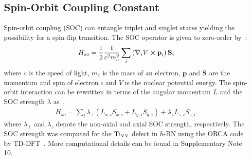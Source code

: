 \subsection{Spin-Orbit Coupling Constant} Spin-orbit coupling (SOC) can entangle triplet and singlet states yielding the possibility for a spin-flip transition. The SOC operator is given to zero-order by~\cite{maze2011properties}:
\begin{align}
    H_{so} = \frac{1}{2} \frac{1}{c^2m_e^2} \sum_i \left(
        \nabla_i V \cross \textbf{p}_i \right) \textbf{S}_i \label{eq:soc-full}
\end{align}
where $c$ is the speed of light, $m_e$ is the mass of an electron, $\textbf{p}$ and $\textbf{S}$ are the momentum and spin of electron $i$ and $V$ is the nuclear potential energy. The spin-orbit interaction can be rewritten in terms of the angular momentum $L$ and the SOC strength $\lambda$ as~\cite{maze2011properties},
\begin{align}
    H_{so} = \sum_i \lambda_{\perp} (L_{x,i}S_{x,i} + L_{y,i}S_{y,i}) + \lambda_z L_{z,i}S_{z,i}.
\end{align}
where $\lambda_{\perp}$ and $\lambda_z$ denote the non-axial and axial SOC strength, respectively. The SOC strength was computed for the $\text{Ti}_{\text{V}\text{V}}$ defect in $h$-BN using the ORCA code by TD-DFT~\cite{neese2012orca,de2019predicting}.
More computational details can be found in Supplementary Note 10.
